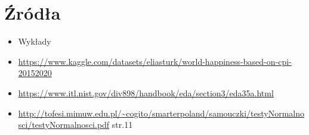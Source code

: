 \documentclass{article}
\theoremstyle{break}
\begin{document}
	\section{Źródła}
	\begin{itemize}
		\item Wykłady
		\item \url{https://www.kaggle.com/datasets/eliasturk/world-happiness-based-on-cpi-20152020}
		\item \url{https://www.itl.nist.gov/div898/handbook/eda/section3/eda35a.html}
		\item \url{http://tofesi.mimuw.edu.pl/~cogito/smarterpoland/samouczki/testyNormalnosci/testyNormalnosci.pdf} str.11
		
	\end{itemize}
	
	
\end{document}
